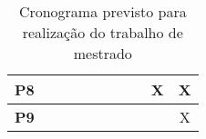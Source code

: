 \begin{table}[b]
{\begin{tabular}{@{}cccccccccc@{}}
\multicolumn{1}{|c|}{\textbf{P8}} & \multicolumn{1}{c|}{}  & \multicolumn{1}{c|}{}  & \multicolumn{1}{c|}{}  & \multicolumn{1}{c|}{}  & \multicolumn{1}{c|}{}  & \multicolumn{1}{c|}{}  & \multicolumn{1}{c|}{}  & \multicolumn{1}{c|}{X} & \multicolumn{1}{c|}{X} \\ \midrule
\multicolumn{1}{|c|}{\textbf{P9}} & \multicolumn{1}{c|}{}  & \multicolumn{1}{c|}{}  & \multicolumn{1}{c|}{}  & \multicolumn{1}{c|}{}  & \multicolumn{1}{c|}{}  & \multicolumn{1}{c|}{}  & \multicolumn{1}{c|}{}  & \multicolumn{1}{c|}{}  & \multicolumn{1}{c|}{X} \\ \bottomrule
\end{tabular}
}
\caption[Cronograma do trabalho]{Cronograma previsto para realização do trabalho de mestrado}
\label{tab:cronograma}
\end{table}
% 
